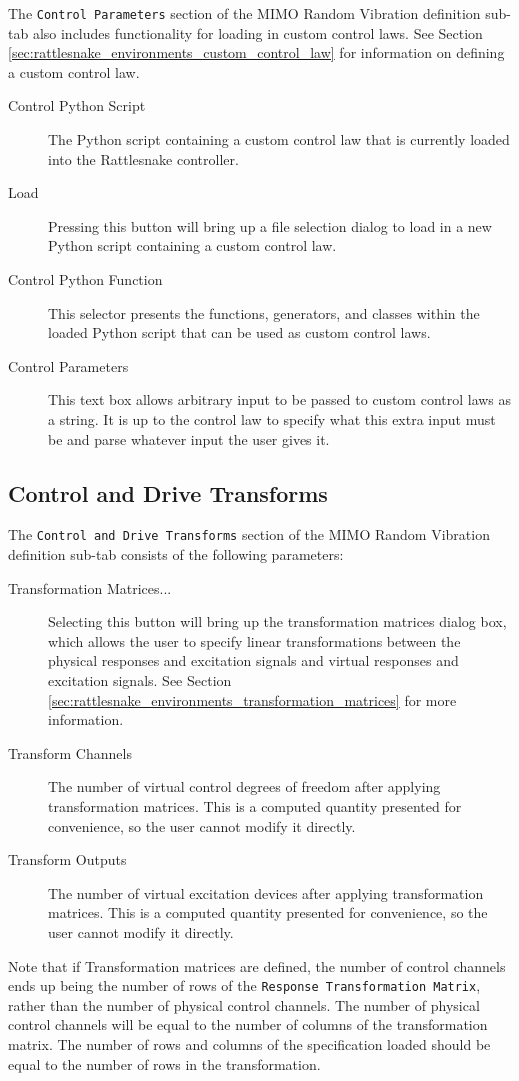 \documentclass[pdf,12pt,report]{SANDreport}
\newcommand{\inlineCode}{\lstinline[basicstyle=\bfseries\ttfamily]}
\begin{document}
    The \inlineCode{Control Parameters} section of the \Ac{MIMO} Random Vibration definition sub-tab also includes functionality for loading in custom control laws.  See Section \ref{sec:rattlesnake_environments_custom_control_law} for information on defining a custom control law.
    \begin{description}
        \item[Control Python Script] The Python script containing a custom control law that is currently loaded into the Rattlesnake controller.
        \item[Load] Pressing this button will bring up a file selection dialog to load in a new Python script containing a custom control law.
        \item[Control Python Function] This selector presents the functions, generators, and classes within the loaded Python script that can be used as custom control laws.
        \item[Control Parameters] This text box allows arbitrary input to be passed to custom control laws as a string.  It is up to the control law to specify what this extra input must be and parse whatever input the user gives it.
    \end{description}

    \subsection{Control and Drive Transforms}
    The \inlineCode{Control and Drive Transforms} section of the \Ac{MIMO} Random Vibration definition sub-tab consists of the following parameters:
    \begin{description}
        \item[Transformation Matrices...] Selecting this button will bring up the transformation matrices dialog box, which allows the user to specify linear transformations between the physical responses and excitation signals and virtual responses and excitation signals.  See Section \ref{sec:rattlesnake_environments_transformation_matrices} for more information.
        \item[Transform Channels] The number of virtual control degrees of freedom after applying transformation matrices.  This is a computed quantity presented for convenience, so the user cannot modify it directly.
        \item[Transform Outputs] The number of virtual excitation devices after applying transformation matrices.  This is a computed quantity presented for convenience, so the user cannot modify it directly.
    \end{description}
    Note that if Transformation matrices are defined, the number of control channels ends up being the number of rows of the \inlineCode{Response Transformation Matrix}, rather than the number of physical control channels.  The number of physical control channels will be equal to the number of columns of the transformation matrix.  The number of rows and columns of the specification loaded should be equal to the number of rows in the transformation.
    
\end{document}
